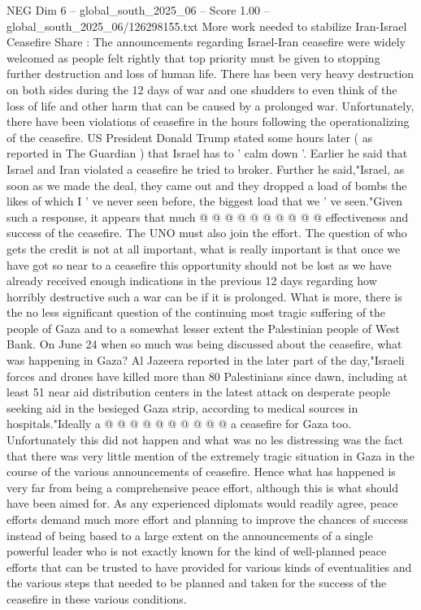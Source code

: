 \begin{textsample}{NEG Dim 6 – global\_south\_2025\_06 – Score 1.00 – global\_south\_2025\_06/126298155.txt}  \label{ex:f6_neg_433}
More work needed to stabilize Iran-Israel Ceasefire Share : The announcements regarding Israel-Iran ceasefire were widely welcomed as people felt rightly that top priority must be given to stopping further destruction and loss of human life.
There has been very heavy destruction on both sides during the 12 days of war and one shudders to even think of the loss of life and other harm that can be caused by a prolonged war.
Unfortunately, there have been violations of ceasefire in the hours following the operationalizing of the ceasefire.
US President Donald Trump stated some hours later ( as reported in The Guardian ) that Israel has to ' calm down '.
Earlier he said that Israel and Iran violated a ceasefire he tried to broker.
Further he said,"Israel, as soon as we made the deal, they came out and they dropped a load of bombs the likes of which I ' ve never seen before, the biggest load that we ' ve seen."Given such a response, it appears that much @ @ @ @ @ @ @ @ @ @ effectiveness and success of the ceasefire.
The UNO must also join the effort.
The question of who gets the credit is not at all important, what is really important is that once we have got so near to a ceasefire this opportunity should not be lost as we have already received enough indications in the previous 12 days regarding how horribly destructive such a war can be if it is prolonged.
What is more, there is the no less significant question of the continuing most tragic suffering of the people of Gaza and to a somewhat lesser extent the Palestinian people of West Bank.
On June 24 when so much was being discussed about the ceasefire, what was happening in Gaza?
Al Jazeera reported in the later part of the day,"Israeli forces and drones have killed more than 80 Palestinians since dawn, including at least 51 near aid distribution centers in the latest attack on desperate people seeking aid in the besieged Gaza strip, according to medical sources in hospitals."Ideally a @ @ @ @ @ @ @ @ @ @ a ceasefire for Gaza too.
Unfortunately this did not happen and what was no les distressing was the fact that there was very little mention of the extremely tragic situation in Gaza in the course of the various announcements of ceasefire.
Hence what has happened is very far from being a comprehensive peace effort, although this is what should have been aimed for.
As any experienced diplomats would readily agree, peace efforts demand much more effort and planning to improve the chances of success instead of being based to a large extent on the announcements of a single powerful leader who is not exactly known for the kind of well-planned peace efforts that can be trusted to have provided for various kinds of eventualities and the various steps that needed to be planned and taken for the success of the ceasefire in these various conditions.

\end{textsample}
